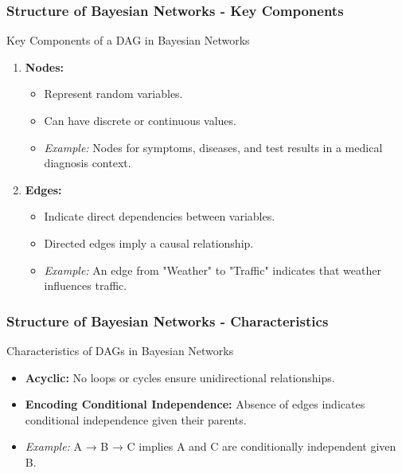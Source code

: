\documentclass[aspectratio=169]{beamer}
\begin{document}
\begin{frame}[fragile]
    \frametitle{Structure of Bayesian Networks - Key Components}
    \begin{block}{Key Components of a DAG in Bayesian Networks}
        \begin{enumerate}
            \item \textbf{Nodes:}
                \begin{itemize}
                    \item Represent random variables.
                    \item Can have discrete or continuous values.
                    \item \textit{Example:} Nodes for symptoms, diseases, and test results in a medical diagnosis context.
                \end{itemize}
            \item \textbf{Edges:}
                \begin{itemize}
                    \item Indicate direct dependencies between variables.
                    \item Directed edges imply a causal relationship. 
                    \item \textit{Example:} An edge from "Weather" to "Traffic" indicates that weather influences traffic.
                \end{itemize}
        \end{enumerate}
    \end{block}
\end{frame}

\begin{frame}[fragile]
    \frametitle{Structure of Bayesian Networks - Characteristics}
    \begin{block}{Characteristics of DAGs in Bayesian Networks}
        \begin{itemize}
            \item \textbf{Acyclic:} No loops or cycles ensure unidirectional relationships.
            \item \textbf{Encoding Conditional Independence:} Absence of edges indicates conditional independence given their parents.
        \end{itemize}
        \begin{itemize}
            \item \textit{Example:} A → B → C implies A and C are conditionally independent given B.
        \end{itemize}
    \end{block}
\end{frame}
\end{document}
